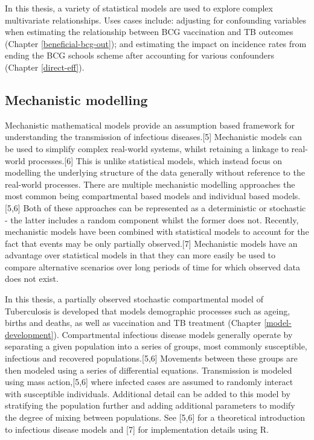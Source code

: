 \documentclass[11pt,twoside]{bristolthesis}
\begin{document}
  In this thesis, a variety of statistical models are used to explore complex multivariate relationships. Uses cases include: adjusting for confounding variables when estimating the relationship between BCG vaccination and TB outcomes (Chapter \ref{beneficial-bcg-out}); and estimating the impact on incidence rates from ending the BCG schools scheme after accounting for various confounders (Chapter \ref{direct-eff}).
  
  \hypertarget{mechanistic-modelling}{%
  \subsection{Mechanistic modelling}\label{mechanistic-modelling}}
  
  Mechanistic mathematical models provide an assumption based framework for understanding the transmission of infectious diseases.{[}5{]} Mechanistic models can be used to simplify complex real-world systems, whilst retaining a linkage to real-world processes.{[}6{]} This is unlike statistical models, which instead focus on modelling the underlying structure of the data generally without reference to the real-world processes. There are multiple mechanistic modelling approaches the most common being compartmental based models and individual based models.{[}5,6{]} Both of these approaches can be represented as a deterministic or stochastic - the latter includes a random component whilst the former does not. Recently, mechanistic models have been combined with statistical models to account for the fact that events may be only partially observed.{[}7{]} Mechanistic models have an advantage over statistical models in that they can more easily be used to compare alternative scenarios over long periods of time for which observed data does not exist.
  
  In this thesis, a partially observed stochastic compartmental model of Tuberculosis is developed that models demographic processes such as ageing, births and deaths, as well as vaccination and TB treatment (Chapter \ref{model-development}). Compartmental infectious disease models generally operate by separating a given population into a series of groups, most commonly susceptible, infectious and recovered populations.{[}5,6{]} Movements between these groups are then modeled using a series of differential equations. Transmission is modeled using mass action,{[}5,6{]} where infected cases are assumed to randomly interact with susceptible individuals. Additional detail can be added to this model by stratifying the population further and adding additional parameters to modify the degree of mixing between populations. See {[}5,6{]} for a theoretical introduction to infectious disease models and {[}7{]} for implementation details using R.
  
\end{document}
